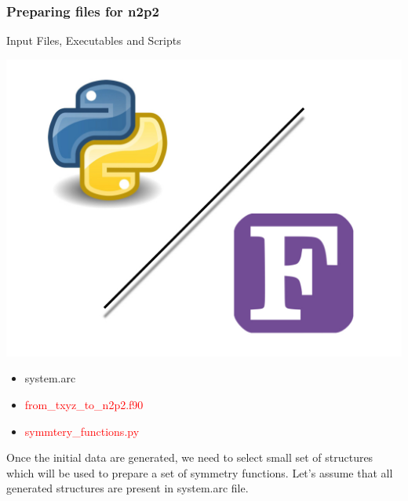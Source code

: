 \documentclass[12pt]{article}
\begin{document}
\subsubsection{Preparing files for n2p2}
\begin{mybox2}{{Input Files, Executables and Scripts}}
\begin{minipage}[c]{0.5\linewidth}
\includegraphics[scale=0.1]{Python-fortran.jpeg}
\end{minipage}
\begin{minipage}[c]{0.5\linewidth}
\begin{itemize}
    \item system.arc
    \item \textcolor{red}{from\_txyz\_to\_n2p2.f90}
    \item \textcolor{red}{symmtery\_functions.py}
\end{itemize}
\end{minipage}
\end{mybox2}
Once the initial data are generated, we need to select small set of structures which will be used to prepare a set of symmetry functions.  
Let's assume that all generated structures are present in system.arc file. 
\end{document}

